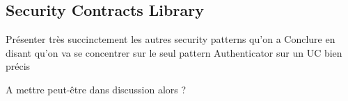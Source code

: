 \subsection{Security Contracts Library}

Présenter très succinctement les autres security patterns qu’on a 
Conclure en disant qu’on va se concentrer sur le seul pattern Authenticator sur un UC bien précis

A mettre peut-être dans discussion alors ?

